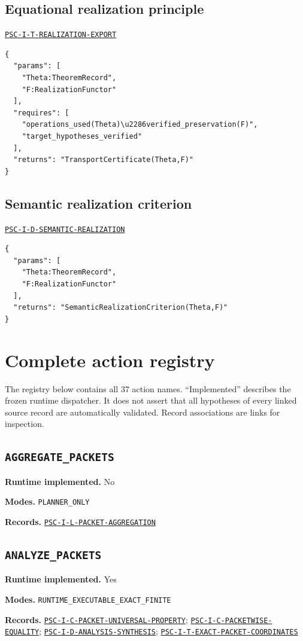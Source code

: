 \documentclass[a4paper,11pt]{article}
\newcommand{\field}[2]{\par\smallskip\noindent\textbf{#1.} #2\par}
\begin{document}
\subsection*{Equational realization principle}
\hyperref[rec:PSC-I-T-REALIZATION-EXPORT]{\nolinkurl{PSC-I-T-REALIZATION-EXPORT}}
\begin{lstlisting}
{
  "params": [
    "Theta:TheoremRecord",
    "F:RealizationFunctor"
  ],
  "requires": [
    "operations_used(Theta)\u2286verified_preservation(F)",
    "target_hypotheses_verified"
  ],
  "returns": "TransportCertificate(Theta,F)"
}
\end{lstlisting}
\subsection*{Semantic realization criterion}
\hyperref[rec:PSC-I-D-SEMANTIC-REALIZATION]{\nolinkurl{PSC-I-D-SEMANTIC-REALIZATION}}
\begin{lstlisting}
{
  "params": [
    "Theta:TheoremRecord",
    "F:RealizationFunctor"
  ],
  "returns": "SemanticRealizationCriterion(Theta,F)"
}
\end{lstlisting}
\clearpage\section{Complete action registry}
The registry below contains all 37 action names. ``Implemented'' describes the frozen runtime dispatcher. It does not assert that all hypotheses of every linked source record are automatically validated. Record associations are links for inspection.
\subsection*{\nolinkurl{AGGREGATE_PACKETS}}
\field{Runtime implemented}{No}
\field{Modes}{\nolinkurl{PLANNER_ONLY}}
\field{Records}{\hyperref[rec:PSC-I-L-PACKET-AGGREGATION]{\nolinkurl{PSC-I-L-PACKET-AGGREGATION}}}
\subsection*{\nolinkurl{ANALYZE_PACKETS}}
\field{Runtime implemented}{Yes}
\field{Modes}{\nolinkurl{RUNTIME_EXECUTABLE_EXACT_FINITE}}
\field{Records}{\hyperref[rec:PSC-I-C-PACKET-UNIVERSAL-PROPERTY]{\nolinkurl{PSC-I-C-PACKET-UNIVERSAL-PROPERTY}}; \hyperref[rec:PSC-I-C-PACKETWISE-EQUALITY]{\nolinkurl{PSC-I-C-PACKETWISE-EQUALITY}}; \hyperref[rec:PSC-I-D-ANALYSIS-SYNTHESIS]{\nolinkurl{PSC-I-D-ANALYSIS-SYNTHESIS}}; \hyperref[rec:PSC-I-T-EXACT-PACKET-COORDINATES]{\nolinkurl{PSC-I-T-EXACT-PACKET-COORDINATES}}}
\end{document}
